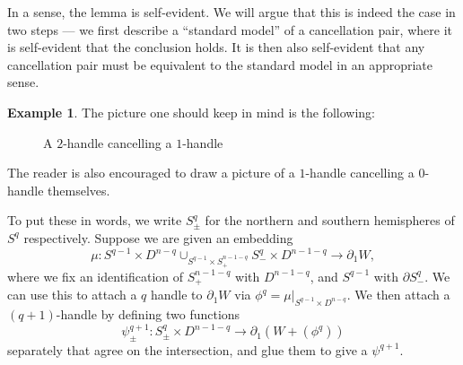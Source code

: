 \documentclass[a4paper, 12pt]{article}
\theoremstyle{definition}
\newtheorem{eg}[thm]{Example}
\begin{document}
In a sense, the lemma is self-evident. We will argue that this is indeed the case in two steps --- we first describe a ``standard model'' of a cancellation pair, where it is self-evident that the conclusion holds. It is then also self-evident that any cancellation pair must be equivalent to the standard model in an appropriate sense. 
\begin{eg}
  The picture one should keep in mind is the following:
  \begin{figure}[H]
    \centering
    \caption{A $2$-handle cancelling a $1$-handle}
  \end{figure}
  The reader is also encouraged to draw a picture of a $1$-handle cancelling a $0$-handle themselves.

  To put these in words, we write $S^q_{\pm}$ for the northern and southern hemispheres of $S^q$ respectively. Suppose we are given an embedding
  \[
    \mu: S^{q - 1} \times D^{n - q} \cup_{S^{q - 1} \times S^{n - 1 - q}_+} S^q_- \times D^{n - 1 - q} \to \partial_1 W,
  \]
  where we fix an identification of $S^{n - 1 - q}_+$ with $D^{n - 1 - q}$, and $S^{q - 1}$ with $\partial S^q_-$. We can use this to attach a $q$ handle to $\partial_1 W$ via $\phi^q = \mu|_{S^{q - 1} \times D^{n - q}}$. We then attach a $(q + 1)$-handle by defining two functions
  \[
    \psi^{q + 1}_{\pm}: S_{\pm}^q \times D^{n - 1 - q} \to \partial_1(W + (\phi^q))
  \]
  separately that agree on the intersection, and glue them to give a $\psi^{q + 1}$.
  

\end{eg}
\end{document}
